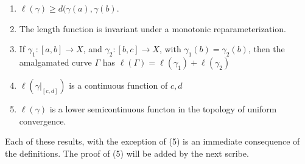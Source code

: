 \documentclass[12pt]{amsart}
\begin{document}
\begin{enumerate}
    \item $\ell(\gamma) \geq d(\gamma(a), \gamma(b)$. 
    \item The length function is invariant under a monotonic reparameterization. 
    \item If $\gamma_1:[a,b] \to X$, and $\gamma_2:[b,c] \to X$, with $\gamma_1(b) = \gamma_2(b)$, then the amalgamated curve $\Gamma$ has $\ell(\Gamma) = \ell(\gamma_1) + \ell(\gamma_2)$
    \item $\ell(\gamma|_{[c,d]})$ is a continuous function of $c,d$
    \item $\ell(\gamma)$ is a lower semicontinuous functon in the topology of uniform convergence.
\end{enumerate}

Each of these results, with the exception of (5) is an immediate consequence of the definitions. The proof of (5) will be added by the next scribe.
\end{document}
